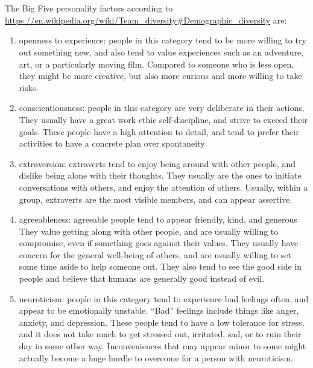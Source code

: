 \documentclass[letterpaper,12pt]{article}
\begin{document}
\section{}
The Big Five personality factors according to \url{https://en.wikipedia.org/wiki/Team_diversity#Demographic_diversity} are:
\begin{enumerate}
  \item openness to experience: people in this category tend to be more willing to try out something new, and also tend to
        value experiences such as an adventure, art, or a particularly moving film. Compared to someone who is less open, they
        might be more creative, but also more curious and more willing to take risks.
  \item conscientiousness: people in this category are very deliberate in their actions. They usually have a great work ethic
        self-discipline, and strive to exceed their goals. These people have a high attention to detail, and tend to prefer their activities to have a concrete plan over spontaneity
  \item extraversion: extraverts tend to enjoy being around with other people, and dislike being alone with their thoughts. They usually are the ones to initiate conversations with others, and enjoy the attention of others. Usually, within a group,
        extraverts are the most visible members, and can appear assertive.
  \item agreeableness:  agreeable people tend to appear friendly, kind, and generous They value getting along with other people, and are usually willing to compromise, even if something goes against their values. They usually have concern for the general
        well-being of others, and are usually willing to set some time aside to help someone out. They also tend to see the good side in people and believe that humans are generally good instead of evil.
  \item neuroticism: people in this category tend to experience bad feelings often, and appear to be emotionally unstable. ``Bad'' feelings include things like anger, anxiety, and depression. These people tend to have a low tolerance for stress, and it does
        not take much to get stressed out, irritated, sad, or to ruin their day in some other way. Inconveniences that may appear minor to some might actually become a huge hurdle to overcome for a person with neuroticism.
\end{enumerate}
\end{document}
